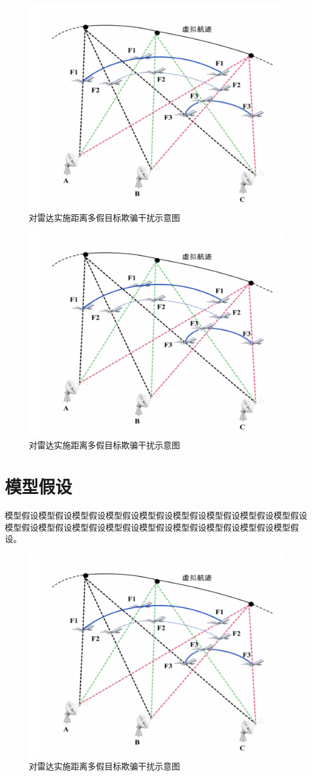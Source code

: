 \documentclass[bwprint]{gmcmthesis}
\numberwithin{figure}{section}
\begin{document}
\begin{figure}[!h]
\centering
\includegraphics[width=.7\textwidth]{test.jpg}
\caption{对雷达实施距离多假目标欺骗干扰示意图}
\label{fig1}
\end{figure}
\begin{figure}[!h]
\centering
\includegraphics[width=.7\textwidth]{test.jpg}
\caption{对雷达实施距离多假目标欺骗干扰示意图}
\label{fig1}
\end{figure}

\section{模型假设}
模型假设模型假设模型假设模型假设模型假设模型假设模型假设模型假设模型假设模型假设模型假设模型假设模型假设模型假设模型假设模型假设模型假设模型假设。
\begin{figure}[!h]
\centering
\includegraphics[width=.7\textwidth]{test.jpg}
\caption{对雷达实施距离多假目标欺骗干扰示意图}
\label{fig1}
\end{figure}
\end{document}

